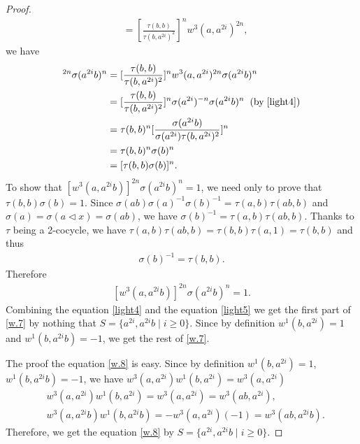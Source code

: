\documentclass[a4paper,11pt]{amsart}
\numberwithin{equation}{section}
\begin{document}
\begin{proof}
\begin{align*}
&=[\frac{\tau(b,b)}{\tau(b,a^{2i})^2}]^{n} w^3(a,a^{2i})^{2n},
\end{align*}
we have
\begin{align*}
[w^3(a,a^{2i}b)]^{2n} \sigma(a^{2i}b)^n&=[\frac{\tau(b,b)}{\tau(b,a^{2i})^2}]^{n} w^3(a,a^{2i})^{2n} \sigma(a^{2i}b)^n\\
&=[\frac{\tau(b,b)}{\tau(b,a^{2i})^2}]^{n} \sigma(a^{2i})^{-n} \sigma(a^{2i}b)^n\;\;(\text{by}\;\eqref{light4})\\
&=\tau(b,b)^n [\frac{\sigma(a^{2i}b)}{\sigma(a^{2i}) \tau(b,a^{2i})^2}]^n\\
&=\tau(b,b)^n \sigma(b)^n\\
&=[\tau(b,b) \sigma(b)]^n.
\end{align*}
To show that $[w^3(a,a^{2i}b)]^{2n} \sigma(a^{2i}b)^n=1$, we need only to prove that $\tau(b,b) \sigma(b)=1$. Since $\sigma(ab)\sigma(a)^{-1}\sigma(b)^{-1}=\tau(a,b)\tau(ab,b)$ and $\sigma(a)=\sigma(a\triangleleft x)=\sigma(ab)$, we have $\sigma(b)^{-1}=\tau(a,b)\tau(ab,b)$. Thanks to $\tau$ being a 2-cocycle, we have $\tau(a,b)\tau(ab,b)=\tau(b,b)\tau(a,1)=\tau(b,b)$ and thus
\begin{align}
\label{sig}\sigma(b)^{-1}=\tau(b,b).
\end{align}
Therefore
\begin{align}
\label{light5}[w^3(a,a^{2i}b)]^{2n} \sigma(a^{2i}b)^n=1.
\end{align}
 Combining the equation \eqref{light4} and the equation \eqref{light5} we get the first part of \eqref{w.7} by nothing that $S=\{a^{2i},a^{2i}b\;|\;i\geq 0\}$. Since by definition $w^1(b,a^{2i})=1$ and $w^1(b,a^{2i}b)=-1$, we get the rest of \eqref{w.7}.

 The proof the equation \eqref{w.8} is easy. Since by definition $w^1(b,a^{2i})=1$, $w^1(b,a^{2i}b)=-1$, we have
 $w^3(a,a^{2i}) w^1(b,a^{2i})=w^3(a,a^{2i}) $
\begin{align*}
&w^3(a,a^{2i}) w^1(b,a^{2i})=w^3(a,a^{2i})= w^3(ab,a^{2i}),\\
&w^3(a,a^{2i}b) w^1(b,a^{2i}b)=-w^3(a,a^{2i})(-1)=w^3(ab,a^{2i}b).
\end{align*}
Therefore, we get the equation \eqref{w.8} by $S=\{a^{2i},a^{2i}b\;|\;i\geq 0\}$.


\end{proof}
\end{document}
